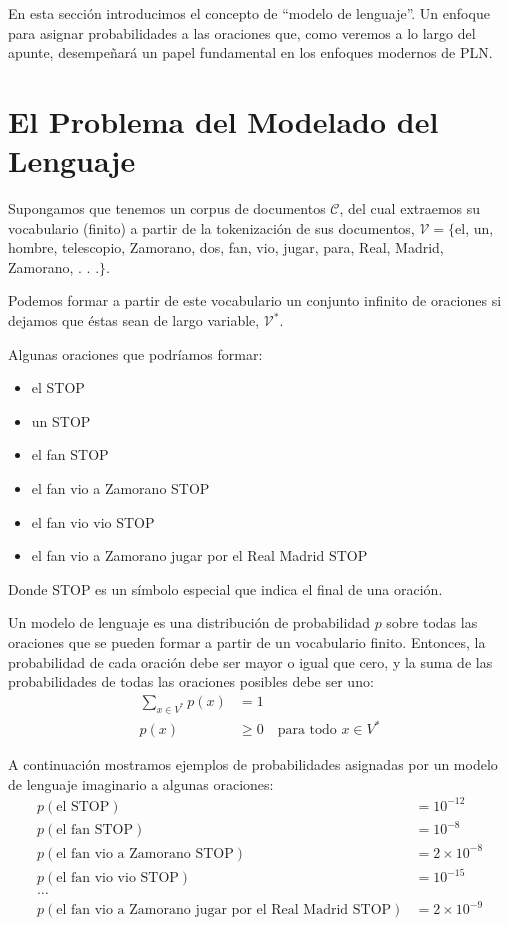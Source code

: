 
En esta sección introducimos el concepto de ``modelo de lenguaje''. Un enfoque para asignar probabilidades a las oraciones que, como veremos a lo largo del apunte, desempeñará un papel fundamental en los enfoques modernos de PLN.

\section{El Problema del Modelado del Lenguaje}
Supongamos que tenemos un corpus de documentos $\mathcal{C}$, del cual extraemos su vocabulario (finito) a partir de la tokenización de sus documentos, $\mathcal{V} = \{$el, un, hombre, telescopio, Zamorano, dos, fan, vio, jugar, para, Real, Madrid, Zamorano, . . .$\}$.

Podemos formar a partir de este vocabulario un conjunto infinito de oraciones si dejamos que éstas sean de largo variable, $\mathcal{V}^*$. 

\begin{example}
Algunas oraciones que podríamos formar:
\begin{itemize}
\item el STOP
\item un STOP
\item el fan STOP
\item el fan vio a Zamorano STOP
\item el fan vio vio STOP
\item el fan vio a Zamorano jugar por el Real Madrid STOP
\end{itemize}

Donde STOP es un símbolo especial que indica el final de una oración.  
\end{example}

\begin{definition}
Un modelo de lenguaje es una distribución de probabilidad $p$ sobre todas las oraciones que se pueden formar a partir de un vocabulario finito. Entonces, la probabilidad de cada oración debe ser mayor o igual que cero, y la suma de las probabilidades de todas las oraciones posibles debe ser uno: 
\begin{align*}
\sum_{x\in V^*} p(x) &= 1 \\
p(x) &\geq 0 \quad \text{para todo } x \in V^*
\end{align*}
\end{definition}


\begin{example}
A continuación mostramos ejemplos de probabilidades asignadas por un modelo de lenguaje imaginario a algunas oraciones:
\begin{align*}
p(\text{el STOP}) &= 10^{-12} \\
p(\text{el fan STOP}) &= 10^{-8} \\
p(\text{el fan vio a Zamorano STOP}) &= 2 \times 10^{-8} \\
p(\text{el fan vio vio STOP}) &= 10^{-15} \\
\ldots \\
p(\text{el fan vio a Zamorano jugar por el Real Madrid STOP}) &= 2 \times 10^{-9}
\end{align*}
\end{example}




